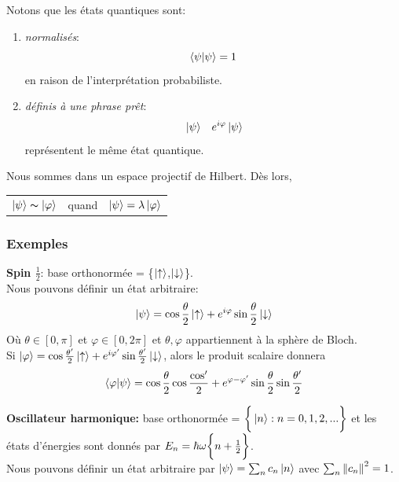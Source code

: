 \documentclass[../notesdecours.tex]{subfiles}
\begin{document}
Notons que les états quantiques sont:
\begin{enumerate}
\item \emph{normalisés}:
\begin{equation}
\braket{\psi|\psi} = 1
\end{equation}
en raison de l'interprétation probabiliste.
\item \emph{définis à une phrase prêt}:
\begin{align}
&\ket{\psi} 	&e^{i\varphi}\ket{\psi}
\end{align}
représentent le même état quantique.
\end{enumerate}
Nous sommes dans un espace projectif de Hilbert. Dès lors,

\begin{center}
\begin{tabular}{ c c c } 
$\ket{\psi} \thicksim \ket{\varphi}$ & quand & $\ket{\psi} = \lambda\ket{\varphi}$  
\end{tabular}
\end{center}

\subsubsection{Exemples}
\textbf{Spin $\frac{1}{2}$}: base orthonormée = \bigg\{$\ket{\uparrow}$,$\ket{\downarrow}$\bigg\}.\\

Nous pouvons définir un état arbitraire:
\begin{equation}
\ket{\psi} = \cos\frac{\theta}{2} \ket{\uparrow}+e^{i\varphi}\sin\frac{\theta}{2}\ket{\downarrow}
\end{equation}
Où $\theta\in[0,\pi]$ et $\varphi \in [0,2\pi]$ et $\theta,\varphi$ appartiennent à la sphère de Bloch.\\

Si $\ket{\varphi} = \cos\frac{\theta'}{2}\ket{\uparrow}+e^{i\varphi'}\sin\frac{\theta'}{2}\ket{\downarrow}$, alors le produit scalaire donnera
\begin{equation}
\braket{\varphi|\psi} = \cos\frac{\theta}{2}\cos\frac{\cos'}{2}+e^{\varphi-\varphi'}\sin\frac{\theta}{2}\sin\frac{\theta'}{2}
\end{equation}

\textbf{Oscillateur harmonique:} base orthonormée = $\bigg\{\ket{n} : n=0,1,2,...\bigg\}$ et les états d'énergies sont donnés par $E_n = \hbar\omega\bigg\{n+\frac{1}{2}\bigg\}$.\\

Nous pouvons définir un état arbitraire par $\ket{\psi} = \sum_n c_n \ket{n}$ avec $\sum_n \norm{c_n}^2 = 1$.
\end{document}
